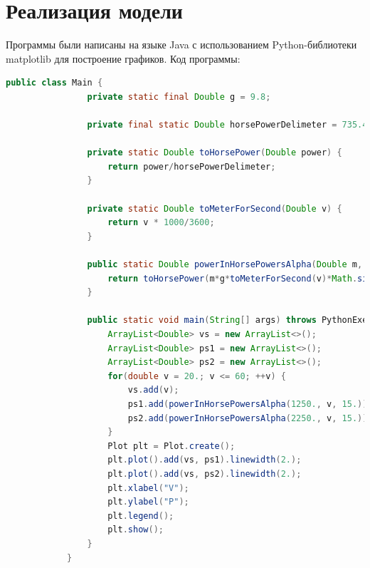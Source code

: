 \documentclass[a4paper, 14pt]{extarticle}
\begin{document}
	\section{Реализация модели}
		Программы были написаны на языке Java с использованием Python-библиотеки matplotlib для построение графиков.
		Код программы:
		\begin{lstlisting}[language=Java]
			public class Main {
				private static final Double g = 9.8;
				
				private final static Double horsePowerDelimeter = 735.499;
				
				private static Double toHorsePower(Double power) {
					return power/horsePowerDelimeter;
				}
				
				private static Double toMeterForSecond(Double v) {
					return v * 1000/3600;
				}
				
				public static Double powerInHorsePowersAlpha(Double m, Double v, Double alpha) {
					return toHorsePower(m*g*toMeterForSecond(v)*Math.sin(Math.toRadians(alpha)));
				}
				
				public static void main(String[] args) throws PythonExecutionException, IOException {
					ArrayList<Double> vs = new ArrayList<>();
					ArrayList<Double> ps1 = new ArrayList<>();
					ArrayList<Double> ps2 = new ArrayList<>();
					for(double v = 20.; v <= 60; ++v) {
						vs.add(v);
						ps1.add(powerInHorsePowersAlpha(1250., v, 15.));
						ps2.add(powerInHorsePowersAlpha(2250., v, 15.));
					}
					Plot plt = Plot.create();
					plt.plot().add(vs, ps1).linewidth(2.);
					plt.plot().add(vs, ps2).linewidth(2.);
					plt.xlabel("V");
					plt.ylabel("P");
					plt.legend();
					plt.show();
				}
			}
		\end{lstlisting}
		\pagebreak
\end{document}
